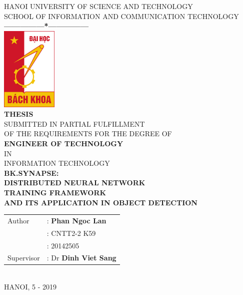 \documentclass[a4paper, 12pt, oneside]{report}
\begin{document}
\begin{spacing}{1.25}
    \thispagestyle{empty}
    \thisfancypage{\setlength{\fboxrule}{1pt}\doublebox}{}
    \begin{center}
        {\fontsize{17}{20}\selectfont HANOI UNIVERSITY OF SCIENCE AND TECHNOLOGY} \\
        {\fontsize{13}{17}\selectfont SCHOOL OF INFORMATION AND COMMUNICATION TECHNOLOGY} \\ [0.25cm]
        \textbf{---------------*---------------} \\ [1cm]
        \includegraphics[width=0.2\textwidth]{hust.jpeg} \\ [1cm]
        {\fontsize{25}{30}\selectfont \textbf{THESIS}} \\ [0.25cm]
        {\fontsize{14}{17}\selectfont SUBMITTED IN PARTIAL FULFILLMENT \\
        OF THE REQUIREMENTS FOR THE DEGREE OF} \\ [0.5cm]
        {\fontsize{25}{30}\selectfont \textbf{ENGINEER OF TECHNOLOGY}} \\ [0.5cm]
        {\fontsize{14}{17}\selectfont IN} \\ [0.5cm]
        {\fontsize{22}{26}\selectfont INFORMATION TECHNOLOGY} \\ [0.5cm]
        {\fontsize{15}{15}\selectfont \textbf{BK.SYNAPSE:\\DISTRIBUTED NEURAL NETWORK\\ TRAINING FRAMEWORK\\ AND ITS APPLICATION IN OBJECT DETECTION}}
        \\ [2.25cm]
        \begin{tabular}{ l l }
            Author & : \textbf{Phan Ngoc Lan} \\
            & : CNTT2-2 K59 \\
            & : 20142505 \\ [0.5cm]
            Supervisor & : Dr \textbf{Dinh Viet Sang}
        \end{tabular} \\ [2.25cm]
        {\fontsize{17}{20}\selectfont HANOI, 5 - 2019}
    \end{center}
\end{spacing}
\pagebreak
\end{document}
